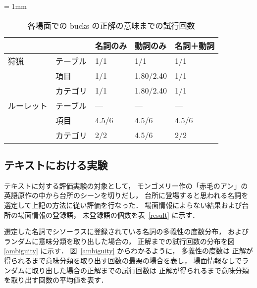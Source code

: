 \small
\begin{table}
  \caption{各場面での bucks の正解の意味までの試行回数}
  \label{bucks_each}
  \begin{center}
    \tabcolsep = 1mm
    \begin{tabular}{|l|l|l|l|l|} \hline
           &          & 名詞のみ  & 動詞のみ   & 名詞＋動詞 \\ \hline \hline
狩猟       & テーブル & 1/1       & 1/1        & 1/1        \\
           & 項目     & 1/1       & 1.80/2.40  & 1/1        \\
           & カテゴリ & 1/1       & 1.80/2.40  & 1/1  \\ \hline
ルーレット & テーブル & ---       & ---        & ---      \\
           & 項目     & 4.5/6     & 4.5/6      & 4.5/6      \\
           & カテゴリ & 2/2       & 4.5/6      & 2/2      \\ \hline
    \end{tabular}
  \end{center}
\end{table}
\normalsize

\subsection{テキストにおける実験}

テキストに対する評価実験の対象として，
モンゴメリー作の「赤毛のアン」の英語原作の中から台所のシーンを切りだし，
台所に登場すると思われる名詞を選定して上記の方法に従い評価を行なった．
場面情報によらない結果および台所の場面情報の登録語，
未登録語の個数を表~\ref{result}
に示す．


選定した名詞でシソーラスに登録されている名詞の多義性の度数分布，
およびランダムに意味分類を取り出した場合の，
正解までの試行回数の分布を図\ref{ambiguity}
に示す．
図~\ref{ambiguity} からわかるように，
多義性の度数は
正解が得られるまで意味分類を取り出す回数の最悪の場合を表し，
場面情報なしでランダムに取り出した場合の正解までの試行回数は
正解が得られるまで意味分類を取り出す回数の平均値を表す．

